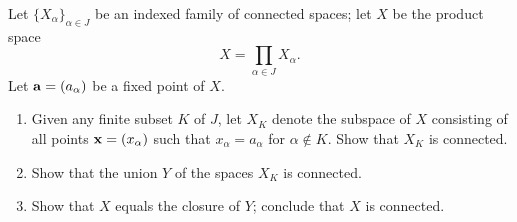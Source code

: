 \begin{exercise}[ID=3.23.10]
  Let $\{X_\alpha\}_{\alpha \in J}$ be an indexed family of connected spaces;
  let $X$ be the product space
  \begin{equation*}
    X = \prod_{\alpha \in J} X_\alpha.
  \end{equation*}
  Let $\mathbf{a} = (a_\alpha)$ be a fixed point of $X$.
  \begin{enumerate}[label={(\alph*)}, align=left, leftmargin=\parindent, listparindent=\parindent, labelwidth=0pt, itemindent=!]
    \item
      Given any finite subset $K$ of $J$, let $X_K$ denote the subspace of $X$ consisting of all points $\mathbf{x} = (x_\alpha)$ such that $x_\alpha = a_\alpha$ for $\alpha \not\in K$.
      Show that $X_K$ is connected.
    \item
      Show that the union $Y$ of the spaces $X_K$ is connected.
    \item
      Show that $X$ equals the closure of $Y$;
      conclude that $X$ is connected.
  \end{enumerate}
\end{exercise}
%
